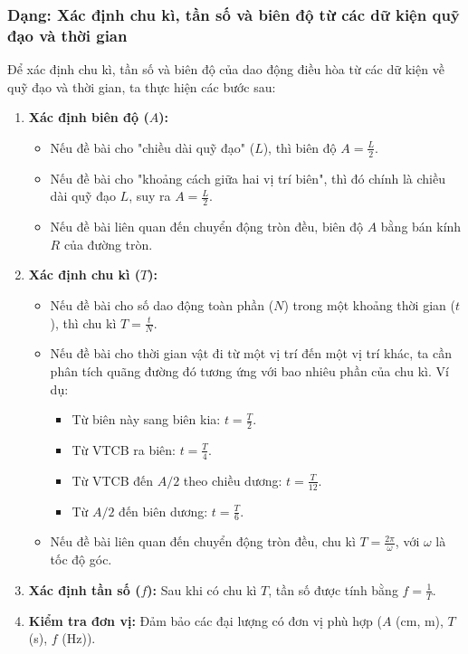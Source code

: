 \subsubsection{Dạng: Xác định chu kì, tần số và biên độ từ các dữ kiện quỹ đạo và thời gian}
\begin{phuongphap}
Để xác định chu kì, tần số và biên độ của dao động điều hòa từ các dữ kiện về quỹ đạo và thời gian, ta thực hiện các bước sau:
\begin{enumerate}
    \item \textbf{Xác định biên độ ($A$):}
    \begin{itemize}
        \item Nếu đề bài cho "chiều dài quỹ đạo" ($L$), thì biên độ $A = \frac{L}{2}$.
        \item Nếu đề bài cho "khoảng cách giữa hai vị trí biên", thì đó chính là chiều dài quỹ đạo $L$, suy ra $A = \frac{L}{2}$.
        \item Nếu đề bài liên quan đến chuyển động tròn đều, biên độ $A$ bằng bán kính $R$ của đường tròn.
    \end{itemize}
    \item \textbf{Xác định chu kì ($T$):}
    \begin{itemize}
        \item Nếu đề bài cho số dao động toàn phần ($N$) trong một khoảng thời gian ($t$), thì chu kì $T = \frac{t}{N}$.
        \item Nếu đề bài cho thời gian vật đi từ một vị trí đến một vị trí khác, ta cần phân tích quãng đường đó tương ứng với bao nhiêu phần của chu kì. Ví dụ:
            \begin{itemize}
                \item Từ biên này sang biên kia: $t = \frac{T}{2}$.
                \item Từ VTCB ra biên: $t = \frac{T}{4}$.
                \item Từ VTCB đến $A/2$ theo chiều dương: $t = \frac{T}{12}$.
                \item Từ $A/2$ đến biên dương: $t = \frac{T}{6}$.
            \end{itemize}
        \item Nếu đề bài liên quan đến chuyển động tròn đều, chu kì $T = \frac{2\pi}{\omega}$, với $\omega$ là tốc độ góc.
    \end{itemize}
    \item \textbf{Xác định tần số ($f$):} Sau khi có chu kì $T$, tần số được tính bằng $f = \frac{1}{T}$.
    \item \textbf{Kiểm tra đơn vị:} Đảm bảo các đại lượng có đơn vị phù hợp ($A$ (cm, m), $T$ (s), $f$ (Hz)).
\end{enumerate}
\end{phuongphap}
